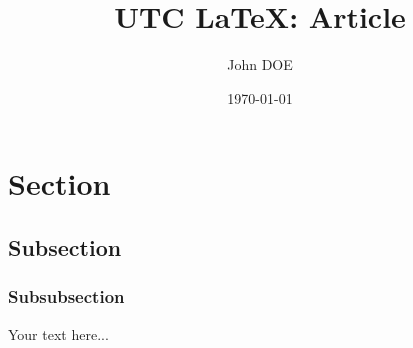 \documentclass[a4paper,12pt]{article}
\title{UTC \LaTeX : Article}
\author{John DOE}
\date{\today}
\begin{document}
\articletitle


\section{Section}
\subsection{Subsection}
\subsubsection{Subsubsection}

Your text here...

\end{document}
